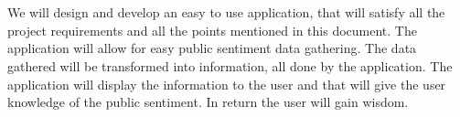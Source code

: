 \documentclass[letterpaper]{article}
\begin{document}
		\vspace{0.2in}
		
		\section*{\colorbox{blue}{}} 
		
		\vspace{0.2in}
		
		We will design and develop an easy to use application, that will satisfy all the project 					requirements and all the points mentioned in this document. The application will allow for easy 			public sentiment data gathering.
		The data gathered will be transformed into information, all done by the application. 						The application will display the information to the user and that will give the user knowledge of 			the public sentiment. In return the user will gain wisdom.
		
		\vspace{0.2in}
		
\end{document}
